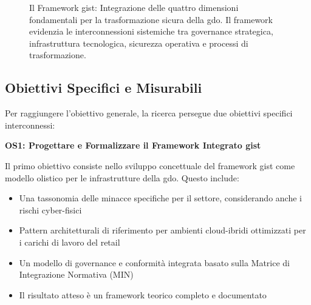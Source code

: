 \begin{figure}[H]
\caption{Il Framework \gls{gist}: Integrazione delle quattro dimensioni fondamentali per la trasformazione sicura della \gls{gdo}. Il framework evidenzia le interconnessioni sistemiche tra governance strategica, infrastruttura tecnologica, sicurezza operativa e processi di trasformazione.}
\label{fig:gist_framework}
\end{figure}

\subsection{\texorpdfstring{\textbf{Obiettivi Specifici e Misurabili}}{1.3.2 - Obiettivi Specifici e Misurabili}}
\label{subsec:obiettivi_specifici}

Per raggiungere l'obiettivo generale, la ricerca persegue due obiettivi specifici interconnessi:

\textbf{OS1: Progettare e Formalizzare il Framework Integrato \gls{gist}}

Il primo obiettivo consiste nello sviluppo concettuale del framework \gls{gist} come modello olistico per le infrastrutture della \gls{gdo}. Questo include:
\begin{itemize}
\item Una tassonomia delle minacce specifiche per il settore, considerando anche i rischi cyber-fisici
\item Pattern architetturali di riferimento per ambienti cloud-ibridi ottimizzati per i carichi di lavoro del retail
\item Un modello di governance e conformità integrata basato sulla Matrice di Integrazione Normativa (MIN)
\item Il risultato atteso è un framework teorico completo e documentato
\end{itemize}

